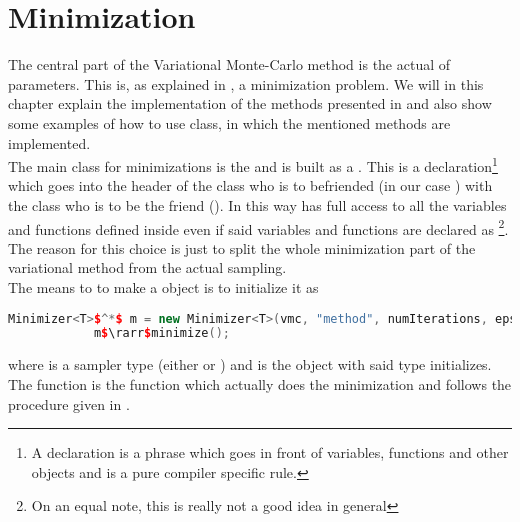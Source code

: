 \section{Minimization}
    The central part of the Variational Monte-Carlo method is the actual
     of parameters. This is, as explained in ,
    a minimization problem. We will in this chapter explain the implementation
    of the methods presented in  and also show some examples of
    how to use  class, in which the mentioned methods are
    implemented. \\
    The main class for minimizations is the  and is built
    as a . This is a \CC declaration\footnote{A \CC
    declaration is a phrase which goes in front of variables, functions and
    other objects and is a pure compiler specific rule.} which goes into the
    header of the class who is to befriended (in our case ) with
    the class who is to be the friend (). In this way
     has full access to all the variables and functions
    defined inside  even if said variables and functions are
    declared as \footnote{On an equal note, this is really not a
    good idea in general}. The reason for this choice is just to split the
    whole minimization part of the variational method from the actual sampling.
    \\
    The means to to make a  object is to initialize it as
        \begin{lstlisting}[language=C++, style=ccstyle]
            Minimizer<T>$^*$ m = new Minimizer<T>(vmc, "method", numIterations, eps);
            m$\rarr$minimize();
        \end{lstlisting}
    where  is a sampler type (either  or
    ) and  is the object with said
    type initializes. The  function is the function which
    actually does the minimization and follows the procedure given in
    .
